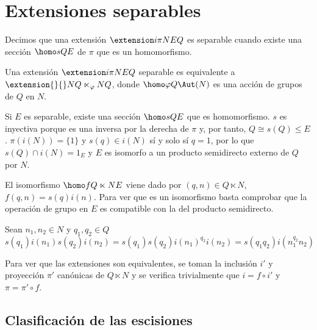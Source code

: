 
\section{Extensiones separables}\label{sec:split}


\begin{definicion}	
	Decimos que una extensión $\extension i \pi N E Q$ es separable cuando existe una sección $\homo s Q E$ de $\pi$ que es un homomorfismo.
\end{definicion}

\begin{teorema}\label{splitext}
	Una extensión $\extension i \pi N E Q$ separable es equivalente a $\extension {} {} N {Q\ltimes_{\varphi} N} Q$, donde $\homo \varphi Q \Aut(N)$ es una acción de grupos de $Q$ en $N$. %
	\begin{demostracion}
		Si $E$ es separable, existe una sección $\homo s Q E$ que es homomorfismo. $s$ es inyectiva porque es una inversa por la derecha de $\pi$ y, por tanto, $Q\cong s(Q) \leq E$.
		$\pi (i(N)) = \{1\}$ y $s(q)\in i(N)$ sí y solo sí $q = 1$, por lo que $s(Q)\cap i(N) = {1_E}$ y $E$ es isomorfo a un producto semidirecto externo de $Q$ por $N$.
		
		El isomorfismo $\homo f {Q\ltimes N} E$ viene dado por $(q,n)\in Q\ltimes N$, $f(q,n) = s(q)i(n)$. Para ver que es un isomorfismo basta comprobar que la operación de grupo en $E$ es compatible con la del producto semidirecto.
		
		Sean $n_1,n_2\in N$ y $q_1,q_2\in Q$
		\begin{equation*}
			s(q_1)i(n_1)s(q_2)i(n_2) = s(q_1)s(q_2)i(n_1)^{q_2}i(n_2) = s(q_1q_2)i(n_1^{q_2}n_2) 
		\end{equation*}
		
		Para ver que las extensiones son equivalentes, se toman la inclusión $i'$ y proyección $\pi'$ canónicas de $Q\ltimes N$ y se verifica trivialmente que $i=f \circ i'$ y $\pi = \pi' \circ f$.
	\end{demostracion}
\end{teorema}


\subsection{Clasificación de las escisiones}

